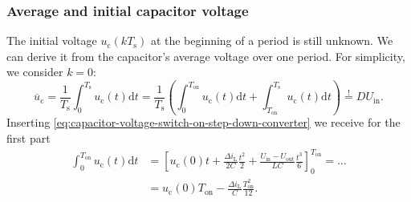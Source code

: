 \begin{frame}
    \frametitle{Average and initial capacitor voltage}
    The initial voltage $u_\mathrm{c}(k T_\mathrm{s})$ at the beginning of a period is still unknown. We can derive it from the capacitor's average voltage over one period. For simplicity, we consider $k=0$:
    \begin{equation}
            \overline{u}_\mathrm{c} = \frac{1}{T_\mathrm{s}}\int_0^{T_\mathrm{s}} u_\mathrm{c}(t) \mathrm{d}t = \frac{1}{T_\mathrm{s}}\left(\int_0^{T_\mathrm{on}} u_\mathrm{c}(t) \mathrm{d}t + \int_{T_\mathrm{on}}^{T_\mathrm{s}} u_\mathrm{c}(t) \mathrm{d}t\right)  \stackrel{!}{=} D U_\mathrm{in}.
            \label{eq:capacitor-voltage-average-step-down-converter}
    \end{equation}
    Inserting \eqref{eq:capacitor-voltage-switch-on-step-down-converter} we receive for the first part
    \begin{equation}
        \begin{split}
            \int_0^{T_\mathrm{on}} u_\mathrm{c}(t) \mathrm{d}t &= \left[u_\mathrm{c}(0)t + \frac{\Delta i_\mathrm{L}}{2C}\frac{t^2}{2} + \frac{U_\mathrm{in}-U_\mathrm{out}}{LC}\frac{t^3}{6} \right]_{0}^{T_\mathrm{on}}=\ldots\\ &= u_\mathrm{c}(0) T_\mathrm{on} - \frac{\Delta i_\mathrm{L}}{C}\frac{T_\mathrm{on}^2}{12}. 
        \end{split}
    \end{equation}
\end{frame}

